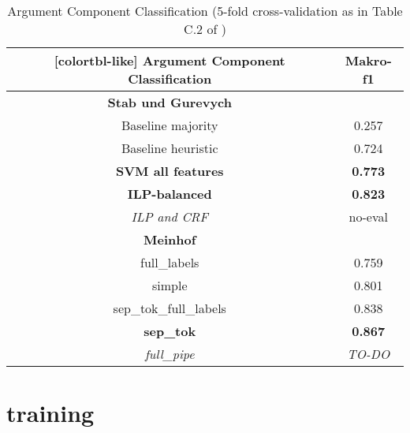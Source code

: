 \documentclass[12]{article}
\newcommand\T{\rule{0pt}{3.5ex}}       %
\newcommand\I{\rule[-1.25ex]{0pt}{0pt}} %
\newcommand\B{\rule[-2.0ex]{0pt}{0pt}} %
\theoremstyle{mytheoremstyle}
\theoremstyle{mytheoremstyle}
\theoremstyle{myproblemstyle}
\begin{document}
  \begin{table}[!h]
    \centering
    \begin{NiceTabular}{c|c}[colortbl-like]
      \large\textbf{Argument Component Classification} &  \large\textbf{Makro-f1}\\
      \hline
      \hline
      \textbf{Stab und Gurevych} & \T \I \\
      Baseline majority & 0.257\\
      Baseline heuristic & 0.724\\
      \textbf{SVM all features} & \textbf{0.773}\\
      \textbf{ILP-balanced} & \textbf{0.823}\\
      \textit{ILP and CRF} & no-eval \B \\
      \hline
      \textbf{Meinhof} & \T \I \\
      full\_labels & 0.759\\
      simple & 0.801\\
      sep\_tok\_full\_labels & 0.838\\
      \textbf{sep\_tok} & \textbf{0.867}\\
      \textit{full\_pipe} & \textit{TO-DO}\\

    \end{NiceTabular}
    \caption{Argument Component Classification (5-fold cross-validation as in Table C.2 of \cite{stab-gurevych-2017-parsing})}
    \label{tab:class_f1}
  \end{table}

  \section{training\dotfill}
  \newpage
  
  
\end{document}
